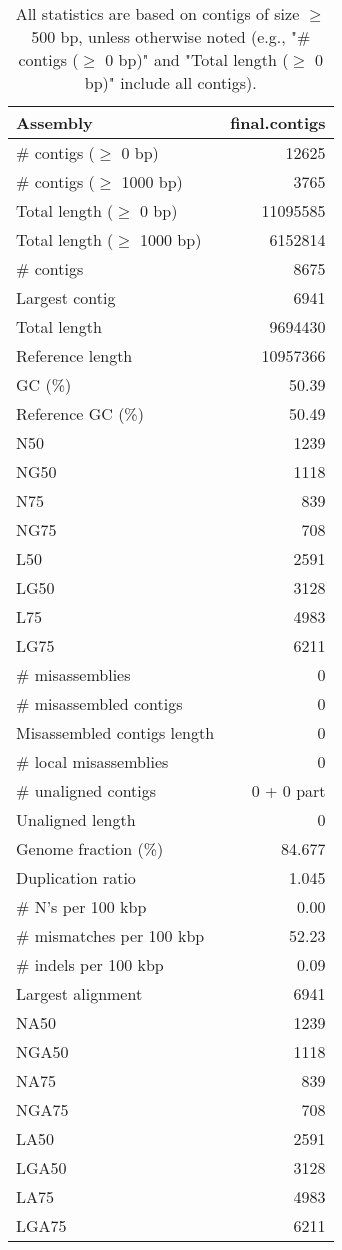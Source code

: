 \documentclass[12pt,a4paper]{article}
\begin{document}
\begin{table}[ht]
\begin{center}
\caption{All statistics are based on contigs of size $\geq$ 500 bp, unless otherwise noted (e.g., "\# contigs ($\geq$ 0 bp)" and "Total length ($\geq$ 0 bp)" include all contigs).}
\begin{tabular}{|l*{1}{|r}|}
\hline
Assembly & final.contigs \\ \hline
\# contigs ($\geq$ 0 bp) & 12625 \\ \hline
\# contigs ($\geq$ 1000 bp) & 3765 \\ \hline
Total length ($\geq$ 0 bp) & 11095585 \\ \hline
Total length ($\geq$ 1000 bp) & 6152814 \\ \hline
\# contigs & 8675 \\ \hline
Largest contig & 6941 \\ \hline
Total length & 9694430 \\ \hline
Reference length & 10957366 \\ \hline
GC (\%) & 50.39 \\ \hline
Reference GC (\%) & 50.49 \\ \hline
N50 & 1239 \\ \hline
NG50 & 1118 \\ \hline
N75 & 839 \\ \hline
NG75 & 708 \\ \hline
L50 & 2591 \\ \hline
LG50 & 3128 \\ \hline
L75 & 4983 \\ \hline
LG75 & 6211 \\ \hline
\# misassemblies & 0 \\ \hline
\# misassembled contigs & 0 \\ \hline
Misassembled contigs length & 0 \\ \hline
\# local misassemblies & 0 \\ \hline
\# unaligned contigs & 0 + 0 part \\ \hline
Unaligned length & 0 \\ \hline
Genome fraction (\%) & 84.677 \\ \hline
Duplication ratio & 1.045 \\ \hline
\# N's per 100 kbp & 0.00 \\ \hline
\# mismatches per 100 kbp & 52.23 \\ \hline
\# indels per 100 kbp & 0.09 \\ \hline
Largest alignment & 6941 \\ \hline
NA50 & 1239 \\ \hline
NGA50 & 1118 \\ \hline
NA75 & 839 \\ \hline
NGA75 & 708 \\ \hline
LA50 & 2591 \\ \hline
LGA50 & 3128 \\ \hline
LA75 & 4983 \\ \hline
LGA75 & 6211 \\ \hline
\end{tabular}
\end{center}
\end{table}
\end{document}
